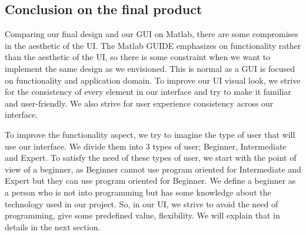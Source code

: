 \documentclass[12pt,a4paper]{article}
\begin{document}
\subsection{Conclusion on the final product}
\par \vspace{0.25cm}Comparing our final design and our GUI on Matlab, there are some compromises in the aesthetic of the UI. The Matlab GUIDE emphasizes on functionality rather than the aesthetic of the UI, so there is some constraint when we want to implement the same design as we envisioned. This is normal as a GUI is focused on functionality and application domain. To improve our UI visual look, we strive for the consistency of every element in our interface and try to make it familiar and user-friendly. We also strive for user experience consistency across our interface.
\par \vspace{0.25cm}To improve the functionality aspect, we try to imagine the type of user that will use our interface. We divide them into 3 types of user; Beginner, Intermediate and Expert. To satisfy the need of these types of user, we start with the point of view of a beginner, as Beginner cannot use program oriented for Intermediate and Expert but they can use program oriented for Beginner. We define a beginner as a person who is not into programming but has some knowledge about the technology used in our project. So, in our UI, we strive to avoid the need of programming, give some predefined value, flexibility. We will explain that in details in the next section.  
\end{document}
